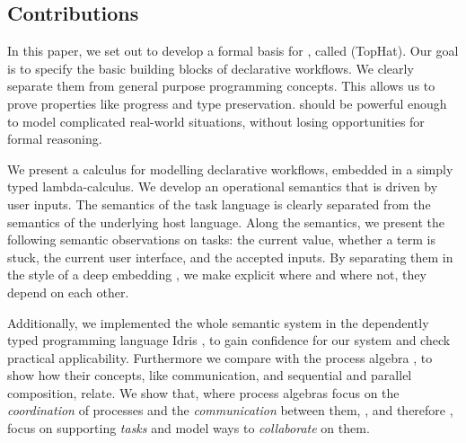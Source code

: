 


\subsection{Contributions}

In this paper, we set out to develop a formal basis for \TOP, called \TOPHAT (TopHat).
Our goal is to specify the basic building blocks of declarative workflows.
We clearly separate them from general purpose programming concepts.
This allows us to prove properties like progress and type preservation.
\TOPHAT should be powerful enough to model complicated real-world situations,
without losing opportunities for formal reasoning.


We present a calculus for modelling declarative workflows, embedded in a simply typed lambda-calculus.
We develop an operational semantics that is driven by user inputs.
The semantics of the task language is clearly separated from the semantics of the underlying host language.
Along the semantics, we present the following semantic observations on tasks: the current value, whether a term is stuck, the current user interface, and the accepted inputs.
By separating them in the style of a deep embedding \cite{conf/cefp/Gibbons13}, we make explicit where and where not, they depend on each other.

Additionally, we implemented the whole semantic system in the dependently typed programming language Idris \cite{journals/jfp/Brady13},
to gain confidence for our system and check practical applicability.
Furthermore we compare \TOPHAT  with the process algebra \CSP, to show how their concepts, like communication, and sequential and parallel composition, relate.
We show that, where process algebras focus on the \emph{coordination} of processes and the \emph{communication} between them,
\TOP, and therefore \TOPHAT, focus on supporting \emph{tasks} and model ways to \emph{collaborate} on them.



